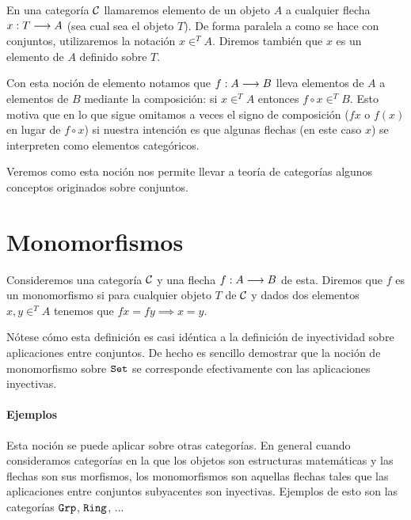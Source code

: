 \begin{definition}
En una categoría $\mathcal{C}$ llamaremos elemento de un objeto $A$
a cualquier flecha $x : T\longrightarrow A$ (sea cual sea el objeto
$T$). De forma paralela a como se hace con conjuntos, utilizaremos
la notación $x \in^T A$. Diremos también que $x$ es un elemento
de $A$ definido sobre $T$.
\end{definition}

Con esta noción de elemento notamos que $f : A\longrightarrow B$ lleva
elementos de $A$ a elementos de $B$ mediante la composición: si
$x \in^T A$ entonces $f \circ x \in^T B$. Esto motiva que en lo que
sigue omitamos a veces el signo de composición ($f x$
o $f(x)$ en lugar
de $f \circ x$) si nuestra intención es
que algunas flechas (en este caso $x$) se interpreten
como elementos categóricos.

Veremos como esta noción nos permite llevar a teoría de categorías
algunos conceptos originados sobre conjuntos.

\section{Monomorfismos}
\begin{definition}
Consideremos una categoría $\mathcal{C}$ y una flecha $f : A\longrightarrow B$ de esta.
Diremos que $f$ es un monomorfismo si para cualquier objeto
$T$ de $\mathcal{C}$ y dados dos elementos
$x, y \in^T A$ tenemos que $fx = fy \implies x = y$.
\end{definition}

Nótese cómo esta definición es casi idéntica a la definición de
inyectividad sobre aplicaciones entre conjuntos. De hecho es sencillo
demostrar que la noción de monomorfismo sobre $\texttt{Set}$ se corresponde
efectivamente con las aplicaciones inyectivas.


\paragraph{Ejemplos}
Esta noción se puede aplicar sobre otras categorías. En general
cuando consideramos categorías en la que los objetos son estructuras
matemáticas y las flechas son sus morfismos, los monomorfismos son
aquellas flechas tales que las aplicaciones entre conjuntos subyacentes
son inyectivas. Ejemplos de esto son las categorías
$\texttt{Grp}$, $\texttt{Ring}$, ...

